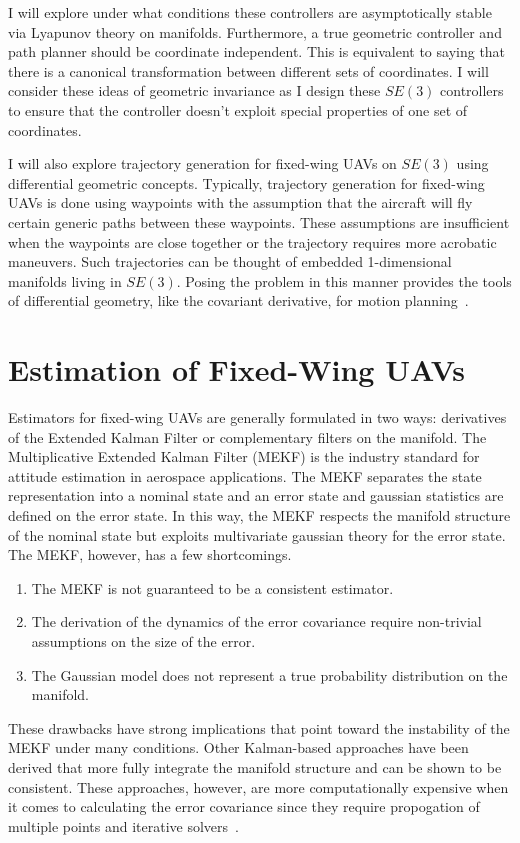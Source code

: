 \documentclass[letterpaper, 10 pt, conference]{ieeeconf}  %
\begin{document}
I will explore under what conditions these controllers are asymptotically stable via Lyapunov theory on manifolds. Furthermore, a true geometric controller and path planner should be coordinate independent. This is equivalent to saying that there is a canonical transformation between different sets of coordinates. I will consider these ideas of geometric invariance as I design these $SE(3)$ controllers to ensure that the controller doesn't exploit special properties of one set of coordinates.

I will also explore trajectory generation for fixed-wing UAVs on $SE(3)$ using differential geometric concepts. Typically, trajectory generation for fixed-wing UAVs is done using waypoints with the assumption that the aircraft will fly certain generic paths between these waypoints. These assumptions are insufficient when the waypoints are close together or the trajectory requires more acrobatic maneuvers. Such trajectories can be thought of embedded 1-dimensional manifolds living in $SE(3)$. Posing the problem in this manner provides the tools of differential geometry, like the covariant derivative, for motion planning~\cite{Zhang2007Robot}.


\section{Estimation of Fixed-Wing UAVs}
Estimators for fixed-wing UAVs are generally formulated in two ways: derivatives of the Extended Kalman Filter or complementary filters on the manifold.
The Multiplicative Extended Kalman Filter (MEKF) is the industry standard for attitude estimation in aerospace applications. The MEKF separates the state representation into a nominal state and an error state and gaussian statistics are defined on the error state. In this way, the MEKF respects the manifold structure of the nominal state but exploits multivariate gaussian theory for the error state. The MEKF, however, has a few shortcomings.
\begin{enumerate}
  \item The MEKF is not guaranteed to be a consistent estimator.
  \item The derivation of the dynamics of the error covariance require non-trivial assumptions on the size of the error.
  \item The Gaussian model does not represent a true probability distribution on the manifold.
\end{enumerate}
These drawbacks have strong implications that point toward the instability of the MEKF under many conditions. Other Kalman-based approaches have been derived that more fully integrate the manifold structure and can be shown to be consistent. These approaches, however, are more computationally expensive when it comes to calculating the error covariance since they require propogation of multiple points and iterative solvers~\cite{Hertzberg2013Integrating}.
\end{document}

